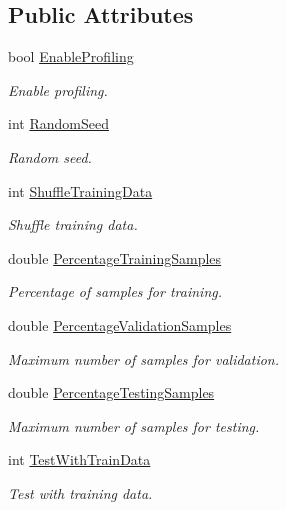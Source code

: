 \subsection*{Public Attributes}
\begin{DoxyCompactItemize}
\item 
bool \hyperlink{classlbann_1_1TrainingParams_a45628c16fa42fb47276e1ebc34759bfa}{Enable\+Profiling}
\begin{DoxyCompactList}\small\item\em Enable profiling. \end{DoxyCompactList}\item 
int \hyperlink{classlbann_1_1TrainingParams_a67d8fbbee9f7899f800aa3de688e9094}{Random\+Seed}
\begin{DoxyCompactList}\small\item\em Random seed. \end{DoxyCompactList}\item 
int \hyperlink{classlbann_1_1TrainingParams_a4cde94bdbbd82aabdb69e616194f74b1}{Shuffle\+Training\+Data}
\begin{DoxyCompactList}\small\item\em Shuffle training data. \end{DoxyCompactList}\item 
double \hyperlink{classlbann_1_1TrainingParams_a3763014b64c2e0396173221796a2bbfa}{Percentage\+Training\+Samples}
\begin{DoxyCompactList}\small\item\em Percentage of samples for training. \end{DoxyCompactList}\item 
double \hyperlink{classlbann_1_1TrainingParams_a0dcb312e1714bfeec89a8119167d115f}{Percentage\+Validation\+Samples}
\begin{DoxyCompactList}\small\item\em Maximum number of samples for validation. \end{DoxyCompactList}\item 
double \hyperlink{classlbann_1_1TrainingParams_acd5f8e76266a47f83518a694ff89e303}{Percentage\+Testing\+Samples}
\begin{DoxyCompactList}\small\item\em Maximum number of samples for testing. \end{DoxyCompactList}\item 
int \hyperlink{classlbann_1_1TrainingParams_a39a6893582111d1934c85f50c0111c1e}{Test\+With\+Train\+Data}
\begin{DoxyCompactList}\small\item\em Test with training data. \end{DoxyCompactList}\item 

\end{DoxyCompactItemize}
